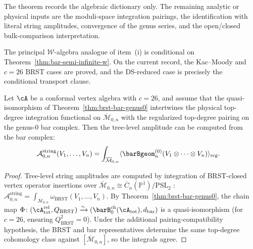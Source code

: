 \begin{remark}
The theorem records the algebraic dictionary only. The remaining
analytic or physical inputs are the moduli-space integration pairings,
the identification with literal string amplitudes, convergence of the
genus series, and the open/closed bulk-comparison interpretation.
\end{remark}

\begin{remark}
The principal $\mathcal{W}$-algebra analogue of item~\textup{(i)}
is conditional on Theorem~\ref{thm:bar-semi-infinite-w}. On the
current record, the Kac--Moody and $c=26$ BRST cases are proved,
and the DS-reduced case is precisely the conditional transport clause.
\end{remark}

\begin{corollary}\label{cor:string-amplitude-genus0}
Let $\cA$ be a conformal vertex algebra with $c = 26$, and assume
that the quasi-isomorphism of
Theorem~\ref{thm:brst-bar-genus0} intertwines the physical top-degree
integration functional on $\overline{\mathcal{M}}_{0,n}$ with the
regularized top-degree pairing on the genus-$0$ bar complex. Then the
tree-level amplitude can be computed from the bar complex:
\[
\mathcal{A}_{0,n}^{\mathrm{string}}(V_1, \ldots, V_n)
= \int_{\overline{\mathcal{M}}_{0,n}}
\langle \barBgeom^{(0)}_n
(V_1 \otimes \cdots \otimes V_n) \rangle_{\mathrm{reg}}.
\]
\end{corollary}

\begin{proof}
Tree-level string amplitudes are computed by integration of
BRST-closed vertex operator insertions over
$\overline{\mathcal{M}}_{0,n} \cong
\overline{C}_{n}(\mathbb{P}^1)/\mathrm{PSL}_2$
\cite[Ch.~5]{Pol98}:
$\mathcal{A}_{0,n}^{\mathrm{string}}
= \int_{\overline{\mathcal{M}}_{0,n}}
\omega_{\mathrm{BRST}}(V_1, \ldots, V_n)$.
By Theorem~\ref{thm:brst-bar-genus0}, the chain map
$\Phi\colon (\cA_{\mathrm{tot}}^{\mathrm{rel}}, Q_{\mathrm{BRST}})
\xrightarrow{\sim}
(\barB^{\mathrm{ch}}_0(\cA_{\mathrm{tot}}), d_{\mathrm{bar}})$
is a quasi-isomorphism (for $c = 26$, ensuring
$Q_{\mathrm{BRST}}^2 = 0$). Under the additional pairing-compatibility
hypothesis, the BRST and bar representatives determine the same
top-degree cohomology class against
$[\overline{\mathcal{M}}_{0,n}]$, so the integrals agree.
\end{proof}


